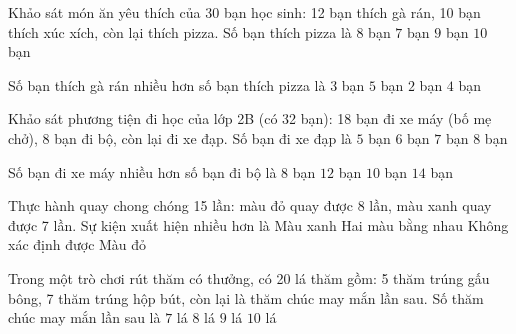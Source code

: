 \begin{ex} %
Khảo sát món ăn yêu thích của 30 bạn học sinh: 12 bạn thích gà rán, 10 bạn thích xúc xích, còn lại thích pizza. Số bạn thích pizza là
\choice
{\True $8$ bạn}
{$7$ bạn}
{$9$ bạn}
{$10$ bạn}
\end{ex}

\begin{ex} %
Số bạn thích gà rán nhiều hơn số bạn thích pizza là
\choice
{$3$ bạn}
{$5$ bạn}
{$2$ bạn}
{\True $4$ bạn}
\end{ex}

\begin{ex} %
Khảo sát phương tiện đi học của lớp 2B (có 32 bạn): 18 bạn đi xe máy (bố mẹ chở), 8 bạn đi bộ, còn lại đi xe đạp. Số bạn đi xe đạp là
\choice
{$5$ bạn}
{\True $6$ bạn}
{$7$ bạn}
{$8$ bạn}
\end{ex}

\begin{ex} %
Số bạn đi xe máy nhiều hơn số bạn đi bộ là
\choice
{$8$ bạn}
{$12$ bạn}
{\True $10$ bạn}
{$14$ bạn}
\end{ex}

\begin{ex} %
Thực hành quay chong chóng 15 lần: màu đỏ quay được 8 lần, màu xanh quay được 7 lần. Sự kiện xuất hiện nhiều hơn là
\choice
{Màu xanh}
{Hai màu bằng nhau}
{Không xác định được}
{\True Màu đỏ}
\end{ex}

\begin{ex} %
Trong một trò chơi rút thăm có thưởng, có 20 lá thăm gồm: 5 thăm trúng gấu bông, 7 thăm trúng hộp bút, còn lại là thăm chúc may mắn lần sau. Số thăm chúc may mắn lần sau là
\choice
{$7$ lá}
{\True $8$ lá}
{$9$ lá}
{$10$ lá}
\end{ex}

